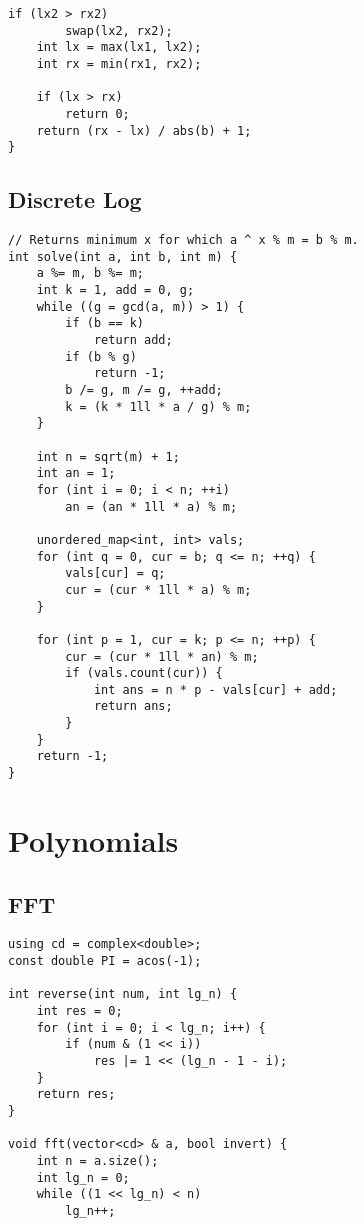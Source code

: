 \documentclass[10pt]{article}
\begin{document}
\begin{multicols*}{2}
\begin{lstlisting}[style=compactcpp]
    if (lx2 > rx2)
        swap(lx2, rx2);
    int lx = max(lx1, lx2);
    int rx = min(rx1, rx2);

    if (lx > rx)
        return 0;
    return (rx - lx) / abs(b) + 1;
}
\end{lstlisting}

\subsection{Discrete Log}

\begin{lstlisting}[style=compactcpp]
// Returns minimum x for which a ^ x % m = b % m.
int solve(int a, int b, int m) {
    a %= m, b %= m;
    int k = 1, add = 0, g;
    while ((g = gcd(a, m)) > 1) {
        if (b == k)
            return add;
        if (b % g)
            return -1;
        b /= g, m /= g, ++add;
        k = (k * 1ll * a / g) % m;
    }

    int n = sqrt(m) + 1;
    int an = 1;
    for (int i = 0; i < n; ++i)
        an = (an * 1ll * a) % m;

    unordered_map<int, int> vals;
    for (int q = 0, cur = b; q <= n; ++q) {
        vals[cur] = q;
        cur = (cur * 1ll * a) % m;
    }

    for (int p = 1, cur = k; p <= n; ++p) {
        cur = (cur * 1ll * an) % m;
        if (vals.count(cur)) {
            int ans = n * p - vals[cur] + add;
            return ans;
        }
    }
    return -1;
}
\end{lstlisting}

\section{Polynomials}

\subsection{FFT}

\begin{lstlisting}[style=compactcpp]
using cd = complex<double>;
const double PI = acos(-1);

int reverse(int num, int lg_n) {
    int res = 0;
    for (int i = 0; i < lg_n; i++) {
        if (num & (1 << i))
            res |= 1 << (lg_n - 1 - i);
    }
    return res;
}

void fft(vector<cd> & a, bool invert) {
    int n = a.size();
    int lg_n = 0;
    while ((1 << lg_n) < n)
        lg_n++;


\end{lstlisting}
\end{multicols*}
\end{document}
